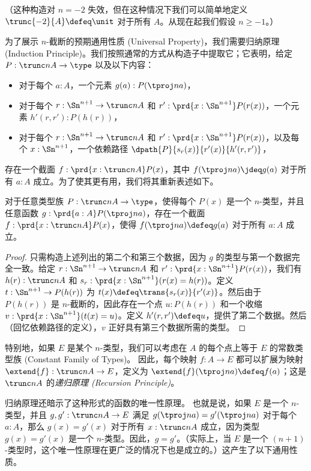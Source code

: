 （这种构造对 $n=-2$ 失效，但在这种情况下我们可以简单地定义 $\trunc{-2}{A}\defeq \unit$ 对于所有 $A$。从现在起我们假设 $n\ge -1$。）

%
为了展示 $n$-截断的预期通用性质 (Universal Property)，我们需要归纳原理 (Induction Principle)。我们按照通常的方式从构造子中提取它；它表明，给定 $P:\trunc nA\to\type$ 以及以下内容：
\begin{itemize}
    \item 对于每个 $a:A$，一个元素 $g(a) : P(\tproj na)$，
    \item 对于每个 $r:\Sn^{n+1} \to \trunc n A$ 和 $r':\prd{x:\Sn^{n+1}} P(r(x))$，一个元素 $h'(r,r'):P(h(r))$，
    \item 对于每个 $r:\Sn^{n+1} \to \trunc n A$ 和 $r':\prd{x:\Sn^{n+1}} P(r(x))$，以及每个 $x:\Sn^{n+1}$，一个依赖路径 $\dpath{P}{s_r(x)}{r'(x)}{h'(r,r')}$，
\end{itemize}
存在一个截面 $f:\prd{x:\trunc n A} P(x)$，其中 $f(\tproj n a) \jdeq g(a)$ 对于所有 $a:A$ 成立。为了使其更有用，我们将其重新表述如下。

\begin{thm}\label{thm:truncn-ind}
对于任意类型族 $P:\trunc n A \to \type$，使得每个 $P(x)$ 是一个 $n$-类型，并且任意函数 $g : \prd{a:A} P(\tproj n a)$，存在一个截面 $f:\prd{x:\trunc n A} P(x)$，使得 $f(\tproj n a)\defeq g(a)$ 对于所有 $a:A$ 成立。
\end{thm}
\begin{proof}
    只需构造上述列出的第二个和第三个数据，因为 $g$ 的类型与第一个数据完全一致。给定 $r:\Sn^{n+1} \to \trunc n A$ 和 $r':\prd{x:\Sn^{n+1}} P(r(x))$，我们有 $h(r):\trunc n A$ 和 $s_r :\prd{x:\Sn^{n+1}} (r(x) = h(r))$。定义 $t:\Sn^{n+1} \to P(h(r))$ 为 $t(x) \defeq \trans{s_r(x)}{r'(x)}$。然后由于 $P(h(r))$ 是 $n$-截断的，因此存在一个点 $u:P(h(r))$ 和一个收缩 $v:\prd{x:\Sn^{n+1}} (t(x) = u)$。定义 $h'(r,r') \defeq u$，提供了第二个数据。然后（回忆依赖路径的定义），$v$ 正好具有第三个数据所需的类型。
\end{proof}

特别地，如果 $E$ 是某个 $n$-类型，我们可以考虑在 $A$ 的每个点上等于 $E$ 的常数类型族 (Constant Family of Types)。 %
因此，每个映射 $f:A\to{}E$ 都可以扩展为映射 $\extend{f}:\trunc nA\to{}E$，定义为 $\extend{f}(\tproj na)\defeq f(a)$；这是 $\trunc n A$ 的\emph{递归原理 (Recursion Principle)}。

归纳原理还暗示了这种形式的函数的唯一性原理。%
也就是说，如果 $E$ 是一个 $n$-类型，并且 $g,g':\trunc nA\to{}E$ 满足 $g(\tproj na)=g'(\tproj na)$ 对于每个 $a:A$，那么 $g(x)=g'(x)$ 对于所有 $x:\trunc nA$ 成立，因为类型 $g(x)=g'(x)$ 是一个 $n$-类型。因此，$g=g'$。（实际上，当 $E$ 是一个 $(n+1)$-类型时，这个唯一性原理在更广泛的情况下也是成立的。）这产生了以下通用性质。

